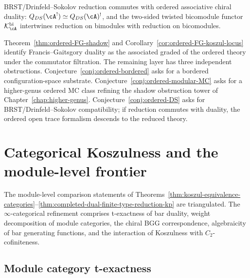 \begin{conjecture}
\label{conj:ordered-DS}
BRST/Drinfeld--Sokolov reduction commutes with ordered associative
chiral duality: $Q_{DS}(\cA^!) \simeq Q_{DS}(\cA)^!$, and the
two-sided twisted bicomodule functor
$\mathcal{K}_\cA^{\mathrm{bi}}$ intertwines reduction on bimodules
with reduction on bicomodules.
\end{conjecture}

Theorem~\ref{thm:ordered-FG-shadow} and
Corollary~\ref{cor:ordered-FG-koszul-locus} identify
Francis--Gaitsgory duality as the associated graded of the ordered
theory under the commutator filtration.  The remaining layer has
three independent obstructions.  Conjecture~\ref{conj:ordered-bordered} asks for a
bordered configuration-space substrate.  Conjecture~\ref{conj:ordered-modular-MC}
asks for a higher-genus ordered MC class refining the shadow
obstruction tower of Chapter~\ref{chap:higher-genus}.  Conjecture~\ref{conj:ordered-DS}
asks for BRST/Drinfeld--Sokolov compatibility; if reduction commutes
with duality, the ordered open trace formalism descends to the
reduced theory.


\section{Categorical Koszulness and the module-level frontier}
\label{sec:categorical-koszulness-frontier}

The module-level comparison statements of
Theorems~\ref{thm:koszul-equivalence-categories}--\ref{thm:completed-dual-finite-type-reduction-kp}
are triangulated. The $\infty$-categorical
refinement comprises t-exactness of bar duality, weight decomposition of module
categories, the chiral BGG correspondence, algebraicity of bar generating
functions, and the interaction of Koszulness with $C_2$-cofiniteness.

\subsection{Module category t-exactness}

